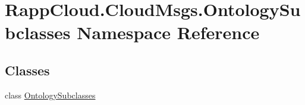 \hypertarget{namespaceRappCloud_1_1CloudMsgs_1_1OntologySubclasses}{\section{Rapp\-Cloud.\-Cloud\-Msgs.\-Ontology\-Subclasses Namespace Reference}
\label{namespaceRappCloud_1_1CloudMsgs_1_1OntologySubclasses}
}
\subsection*{Classes}
\begin{DoxyCompactItemize}
\item 
class \hyperlink{classRappCloud_1_1CloudMsgs_1_1OntologySubclasses_1_1OntologySubclasses}{Ontology\-Subclasses}
\end{DoxyCompactItemize}
